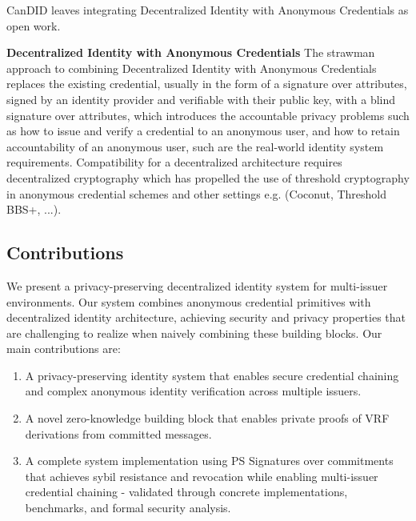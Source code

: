 CanDID leaves integrating Decentralized Identity with Anonymous Credentials as open work.

\noindent \textbf{Decentralized Identity with Anonymous Credentials}
The strawman approach to combining Decentralized Identity with Anonymous Credentials replaces the existing credential, usually in the form of a signature over attributes, signed by an identity provider and verifiable with their public key, with a blind signature over attributes, which introduces the accountable privacy problems such as how to issue and verify a credential to an anonymous user, and how to retain accountability of an anonymous user, such are the real-world identity system requirements. 
Compatibility for a decentralized architecture requires decentralized cryptography which has propelled the use of threshold cryptography in anonymous credential schemes and other settings e.g. (Coconut, Threshold BBS+, ...). 


\newpage

\subsection{Contributions}

We present a privacy-preserving decentralized identity system for multi-issuer environments. Our system combines anonymous credential primitives with decentralized identity architecture, achieving security and privacy properties that are challenging to realize when naively combining these building blocks. Our main contributions are:

\begin{enumerate}
    
    \item  A privacy-preserving identity system that enables secure credential chaining and complex anonymous identity verification across multiple issuers.

    \item A novel zero-knowledge building block that enables private proofs of VRF derivations from committed messages.
    
    \item  A complete system implementation using PS Signatures over commitments that achieves sybil resistance and revocation while enabling multi-issuer credential chaining - validated through concrete implementations, benchmarks, and formal security analysis.

\end{enumerate}

